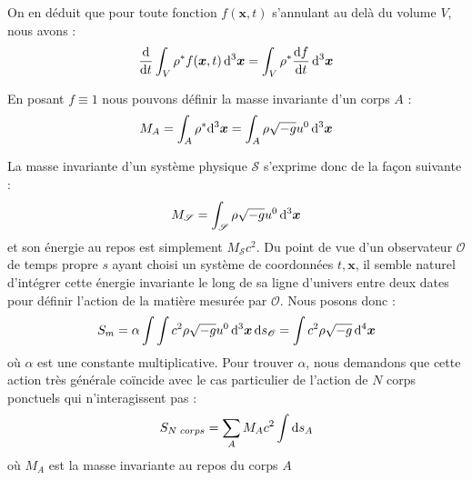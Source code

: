 			On en déduit que pour toute fonction $f(\bm{x},t)$ s'annulant au delà du volume $V$, nous avons :
			\begin{equation}
				\frac{\mathrm{d}}{\mathrm{d} t} \int_V \rho^* f(\bm{x},t) \, \mathrm{d}^3\bm{x} = \int_V \rho^* \frac{\mathrm{d} f}{\mathrm{d} t} \,\mathrm{d}^3\bm{x} 
			\end{equation}

			En posant $f\equiv 1$ nous pouvons définir la masse invariante d'un corps $A$ :
			\begin{equation}
				M_A = \int_A \rho^* \mathrm{d}^3\bm{x} = \int_A \rho \sqrt{-g} u^0 \, \mathrm{d}^3\bm{x}
			\end{equation}

			La masse invariante d'un système physique $\mathscr{S}$ s'exprime donc de la façon suivante :
			\begin{equation}
				M_{\mathscr{S}}=\int_{\mathscr{S}} \rho \sqrt{-g} u^0 \, \mathrm{d}^3\bm{x} 
			\end{equation}
			et son énergie au repos est simplement $M_\mathscr{S}c^2$. Du point de vue d'un observateur $\mathscr{O}$ de temps propre $s$ ayant choisi un système de coordonnées $t,\bm{x}$, il semble naturel d'intégrer cette énergie invariante le long de sa ligne d'univers entre deux dates pour définir l'action de la matière mesurée par $\mathscr{O}$. Nous posons donc :
			\begin{equation}
				S_m = \alpha \int \int c^2 \rho \sqrt{-g} u^0 \, \mathrm{d}^3\bm{x} \, \mathrm{d} s_\mathscr{O} = \int c^2 \rho \sqrt{-g} \, \mathrm{d}^4\bm{x} 
			\end{equation}
			où $\alpha$ est une constante multiplicative. Pour trouver $\alpha$, nous demandons que cette action très générale coïncide avec le cas particulier de l'action de $N$ corps ponctuels qui n'interagissent pas :
			\begin{equation}
				S_{N\phantom{l}corps}=\sum_A M_A c^2 \int \mathrm{d} s_A
			\end{equation}
			où $M_A$ est la masse invariante au repos du corps $A$

